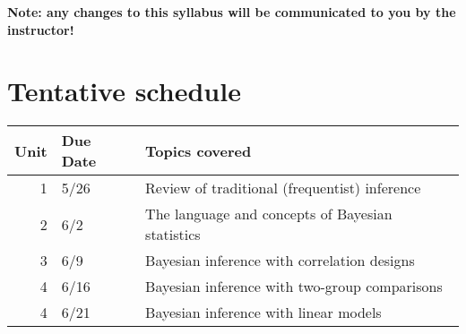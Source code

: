 \documentclass[10pt]{article}
\begin{document}
\textbf{Note:  any changes to this syllabus will be communicated to you by the instructor!}

\section*{Tentative schedule}
\label{sec:org480993b}

\begin{center}
\begin{tabular}{rll}
Unit & Due Date & Topics covered\\[0pt]
\hline
1 & 5/26 & Review of traditional (frequentist) inference\\[0pt]
2 & 6/2 & The language and concepts of Bayesian statistics\\[0pt]
3 & 6/9 & Bayesian inference with correlation designs\\[0pt]
4 & 6/16 & Bayesian inference with two-group comparisons\\[0pt]
4 & 6/21 & Bayesian inference with linear models\\[0pt]
\end{tabular}
\end{center}
\end{document}
